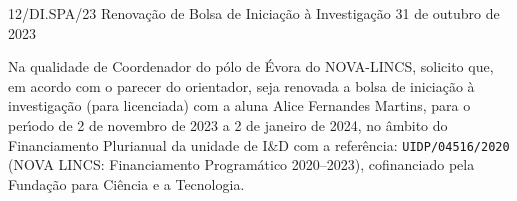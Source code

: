 \documentclass{oficio}
\begin{document}
\unidade{\textsc{\textcolor{gray}{NOVA-LINCS (Pólo de Évora)}}}

\documento
    {12/DI.SPA/23}
    {Renovação de Bolsa de Iniciação à Investigação}
    {31 de outubro de 2023}

Na qualidade de Coordenador do pólo de Évora do NOVA-LINCS, solicito que, em acordo com o parecer do orientador, seja renovada a bolsa de iniciação à investigação (para licenciada) com a aluna Alice Fernandes Martins, para o perı́odo de 2 de novembro de 2023 a 2 de janeiro de 2024, no âmbito do Financiamento Plurianual da unidade de I\&D com a referência: \texttt{UIDP/04516/2020} (NOVA LINCS: Financiamento Programático 2020–2023), cofinanciado pela Fundação para Ciência e a Tecnologia.

\end{document}
